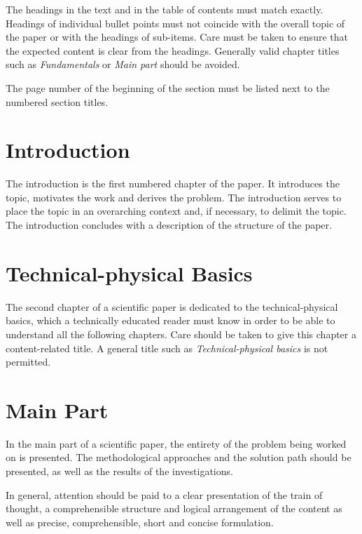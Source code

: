The headings in the text and in the table of contents must match exactly. Headings of individual bullet points must not coincide with the overall topic of the paper or with the headings of sub-items. Care must be taken to ensure that the expected content is clear from the headings. Generally valid chapter titles such as \textit{Fundamentals} or \textit{Main part} should be avoided.

The page number of the beginning of the section must be listed next to the numbered section titles.

\section{Introduction}
\label{sec:Introduction}

The introduction is the first numbered chapter of the paper. It introduces the topic, motivates the work and derives the problem. The introduction serves to place the topic in an overarching context and, if necessary, to delimit the topic. The introduction concludes with a description of the structure of the paper.



\section{Technical-physical Basics}
\label{sec:Fundamentals}

The second chapter of a scientific paper is dedicated to the technical-physical basics, which a technically educated reader must know in order to be able to understand all the following chapters. Care should be taken to give this chapter a content-related title. A general title such as \textit{Technical-physical basics} is not permitted.



\section{Main Part}
\label{sec:MainPart}

In the main part of a scientific paper, the entirety of the problem being worked on is presented. The methodological approaches and the solution path should be presented, as well as the results of the investigations. 

In general, attention should be paid to a clear presentation of the train of thought, a comprehensible structure and logical arrangement of the content as well as precise, comprehensible, short and concise formulation.

